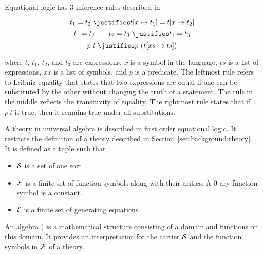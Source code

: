 Equational logic has $3$ inference rules described in~\cite{Gries1993EquationalLogic}  
\begin{proofrules}
        \[ t_1 = t_2 \ \justifies t[x \mapsto t_1] = t[x \mapsto t_2] \]
        \[ t_1 = t_2 \qquad t_2 = t_3 \ \justifies t_1 = t_3 \]
        \[p\ t \ \justifies p\ (t[xs \mapsto ts]) \] 
\end{proofrules}       
\noindent where $t$, $t_1$, $t_2$, and $t_3$ are expressions, $x$ is a symbol in the language, $ts$ is a list of expressions, $xs$ is a list of symbols, and $p$ is a predicate. 
The leftmost rule refers to Leibniz equality that states that two expressions are equal if one can be substituted by the other without changing the truth of a statement. 
The rule in the middle reflects the transitivity of equality. 
The rightmost rule states that if $p\ t$ is true, then it remains true under all substitutions.  

A theory in universal algebra is described in first order equational logic. It restricts the definition of a theory described in Section~\ref{sec:background:theory}. It is defined as a tuple \lstmath{($\sort$,$\fsyms$,$\equations$)}
such that 
\begin{itemize}
\item $\sort$ is a set of one sort . 
\item $\fsyms$ is a finite set of function symbols along with their arities. A $0$-ary function symbol is a constant. 
\item $\equations$ is a finite set of generating equations. 
\end{itemize}

An algebra ) is a mathematical structure consisting of a domain and functions on this domain. It provides an interpretation for the carrier $\sort$ and the function symbols in $\fsyms$ of a theory.  

